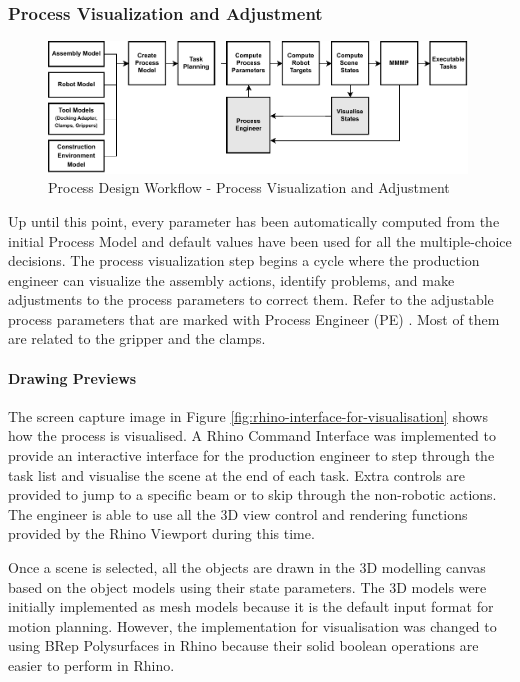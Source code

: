 \FloatBarrier

\subsubsection{Process Visualization and Adjustment}
\label{subsubsection:exploration-3-process-visualization-and-adjustment}

\begin{figure}[!h]
    \centering
    \includegraphics[width=0.99\textwidth]{images/6a/process_6.pdf}
    \caption{Process Design Workflow - Process Visualization and Adjustment}
    \label{fig:process-design-6}
\end{figure}

Up until this point, every parameter has been automatically computed from the initial Process Model and default values have been used for all the multiple-choice decisions. The process visualization step begins a cycle where the production engineer can visualize the assembly actions, identify problems, and make adjustments to the process parameters to correct them. Refer to the adjustable process parameters that are marked with Process Engineer (PE) . Most of them are related to the gripper and the clamps. 

\paragraph{Drawing Previews}

The screen capture image in Figure \ref{fig:rhino-interface-for-visualisation} shows how the process is visualised. A Rhino Command Interface was implemented to provide an interactive interface for the production engineer to step through the task list and visualise the scene at the end of each task. Extra controls are provided to jump to a specific beam or to skip through the non-robotic actions. The engineer is able to use all the 3D view control and rendering functions provided by the Rhino Viewport during this time.

Once a scene is selected, all the objects are drawn in the 3D modelling canvas based on the object models using their state parameters. The 3D models were initially implemented as mesh models because it is the default input format for motion planning. However, the implementation for visualisation was changed to using BRep Polysurfaces in Rhino because their solid boolean operations are easier to perform in Rhino. 

